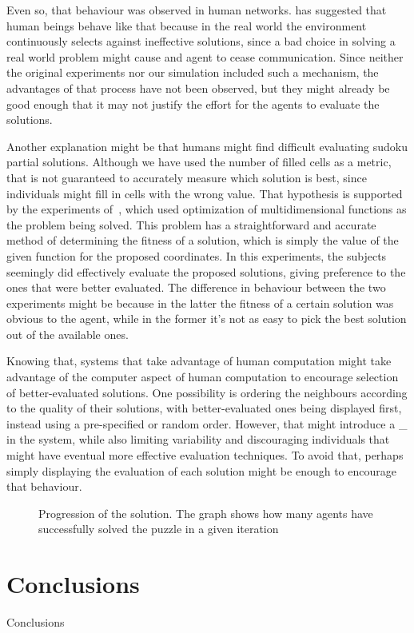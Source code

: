 \documentclass[letterpaper]{article}
\begin{document}
Even so, that behaviour was observed in human networks. \cite{farenzena:collabem} has suggested that human beings behave like that because in the real world the environment continuously selects against ineffective solutions, since a bad choice in solving a real world problem might cause and agent to cease communication. Since neither the original experiments nor our simulation included such a mechanism, the advantages of that process have not been observed, but they might already be good enough that it may not justify the effort for the agents to evaluate the solutions.

Another explanation might be that humans might find difficult evaluating sudoku partial solutions. Although we have used the number of filled cells as a metric, that is not guaranteed to accurately measure which solution is best, since individuals might fill in cells with the wrong value. That hypothesis is supported by the experiments of~\cite{mason:collablearnet}, which used optimization of multidimensional functions as the problem being solved. This problem has a straightforward and accurate method of determining the fitness of a solution, which is simply the value of the given function for the proposed coordinates. In this experiments, the subjects seemingly did effectively evaluate the proposed solutions, giving preference to the ones that were better evaluated. The difference in behaviour between the two experiments might be because in the latter the fitness of a certain solution was obvious to the agent, while in the former it's not as easy to pick the best solution out of the available ones.

Knowing that, systems that take advantage of human computation might take advantage of the computer aspect of human computation to encourage selection of better-evaluated solutions. One possibility is ordering the neighbours according to the quality of their solutions, with better-evaluated ones being displayed first, instead using a pre-specified or random order. However, that might introduce a _ in the system, while also limiting variability and discouraging individuals that might have eventual more effective evaluation techniques. To avoid that, perhaps simply displaying the evaluation of each solution might be enough to encourage that behaviour.

\begin{figure}
\caption{Progression of the solution. The graph shows how many agents have successfully solved the puzzle in a given iteration}
\label{fig:progression}
\end{figure}

\section{Conclusions}

Conclusions



\end{document}
